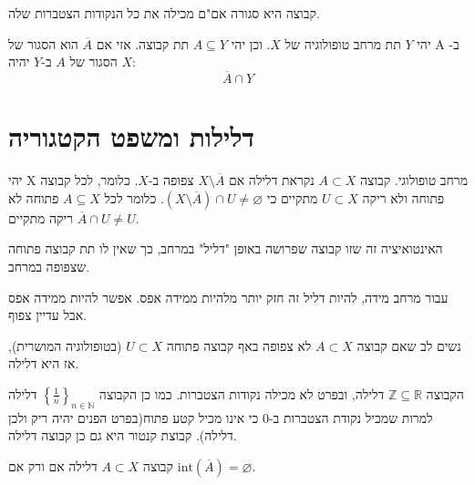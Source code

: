 \documentclass{tstextbook}
\begin{document}
\begin{corollary}
קבוצה היא סגורה אם"ם מכילה את כל הנקודות הצטברות שלה.

\end{corollary}
\begin{proposition}
יהי \(Y\) תת מרחב טופולוגיה של \(X\). וכן יהי \(A\subseteq Y\) תת קבוצה. אזי אם \(\overline{A}\) הוא הסגור של A ב-\(X\) הסגור של \(A\) ב-\(Y\) יהיה:
$$\overline{A} \cap  Y$$

\end{proposition}
\section{דלילות ומשפט הקטגוריה}

\begin{definition}
יהי X מרחב טופולוגי. קבוצה \(A\subset X\) נקראת דלילה אם \(X\setminus\overline{A}\) צפופה ב-\(X\).
כלומר, לכל קבוצה פתוחה ולא ריקה \(U\subset X\) מתקיים כי \(\left( X\setminus\overline{A} \right)\cap U\ne\varnothing\). כלומר לכל \(A\subseteq X\) פתוחה לא ריקה מתקיים \(\overline{A}\cap U\neq U\).

\end{definition}
\begin{remark}
האינטואיציה זה שזו קבוצה שפרושה באופן "דליל" במרחב, כך שאין לו תת קבוצה פתוחה שצפופה במרחב.

\end{remark}
\begin{remark}
עבור מרחב מידה, להיות דליל זה חזק יותר מלהיות ממידה אפס. אפשר להיות ממידה אפס אבל עדיין צפוף.

\end{remark}
\begin{remark}
נשים לב שאם קבוצה \(A\subset X\) לא צפופה באף קבוצה פתוחה \(U\subset X\) (בטופולוגיה המושרית), אז היא דלילה.

\end{remark}
\begin{example}
הקבוצה \(\mathbb{Z}\subseteq \mathbb{R}\) דלילה, ובפרט לא מכילה נקודות הצטברות. כמו כן הקבוצה \(\left\{  \frac{1}{n}  \right\}_{n \in \mathbb{N}}\) דלילה למרות שמכיל נקודת הצטברות ב-\(0\) כי אינו מכיל קטע פתוח(בפרט הפנים יהיה ריק ולכן דלילה). קבוצת קנטור היא גם כן קבוצה דלילה.

\end{example}
\begin{proposition}
קבוצה \(A\subset X\) דלילה אם ורק אם \(\text{int}\left( \overline{A} \right)=\varnothing\).

\end{proposition}
\end{document}
